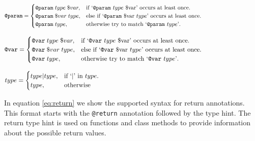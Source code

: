 \documentclass[../main.tex]{subfiles}
\begin{document}
\begin{equation}\label{eq:param}
  \begin{aligned}
  \texttt{@param}=\begin{cases}
    \texttt{@param} \; type \; \$var, & \text{if `\texttt{@param} $type$ \$var' occurs at least once}.\\
    \texttt{@param} \; \$var \; type, & \text{else if `\texttt{@param} \$var $type$' occurs at least once}.\\
    \texttt{@param} \; type, & \text{otherwise try to match `\texttt{@param} $type$'}.\\
  \end{cases}
  \end{aligned}
  \phantom{\hspace{3.55cm}} %
\end{equation}

\begin{equation}\label{eq:var}
  \begin{aligned}
  \texttt{@var}=\begin{cases}
    \texttt{@var} \; type \; \$var, & \text{if `\texttt{@var} $type$ \$var' occurs at least once}.\\
    \texttt{@var} \; \$var \; type, & \text{else if `\texttt{@var} \$var $type$' occurs at least once}.\\
    \texttt{@var} \; type, & \text{otherwise try to match `\texttt{@var} $type$'}.\\
  \end{cases}
  \end{aligned}
  \phantom{\hspace{3.2cm}} %
\end{equation}

\begin{equation}\label{eq:type}
  \begin{aligned}
  type=\begin{cases}
    type|type, & \text{if `$\vert$' in $type$}.\\
    type, & \text{otherwise}
  \end{cases}
  \end{aligned}
  \phantom{\hspace{8.8cm}} %
\end{equation}

	In equation \ref{eq:return} we show the supported syntax for return annotations.
	This format starts with the \texttt{@return} annotation followed by the type hint.
	The return type hint is used on functions and class methods to provide information about the possible return values.
	
\end{document}
